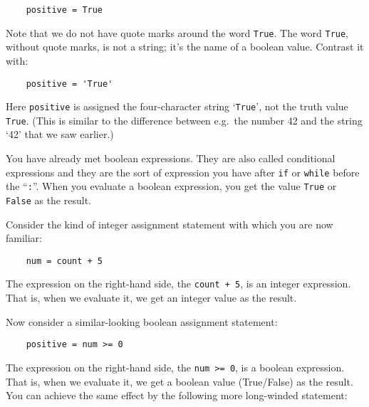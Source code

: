 \begin{Verbatim}
    positive = True
\end{Verbatim}

Note that we do not have quote marks around the word \texttt{True}.  
The word \texttt{True}, without quote marks, is not a string; it's the name of a
boolean value.  Contrast it with:

\begin{Verbatim}
    positive = 'True'
\end{Verbatim}

Here \texttt{positive} is assigned
the four-character string `\texttt{True}', not the truth value
\texttt{True}. (This is similar to the difference between e.g.\ the
number 42 and the string `42' that we saw earlier.)

You have already met boolean expressions.  They are also called conditional
expressions and they are the sort of expression you have
after \texttt{if} or \texttt{while} before the ``\texttt{:}''.
When you evaluate a boolean expression,
you get the value \texttt{True} or \texttt{False} as the result.

Consider the kind of integer assignment statement with which you are
now familiar:

\begin{Verbatim}
    num = count + 5
\end{Verbatim}

The expression on the right-hand side, the \texttt{count + 5}, is an
integer expression.  That is, when we evaluate it, we get an integer value
as the result.

Now consider a similar-looking boolean assignment statement:

\begin{Verbatim}
    positive = num >= 0
\end{Verbatim}

The expression on the right-hand side, the \texttt{num >= 0}, is a
boolean expression.  That is, when we evaluate it, we get a boolean value
(True/False) as the result.
You can achieve
the same effect by the following more long-winded statement:

